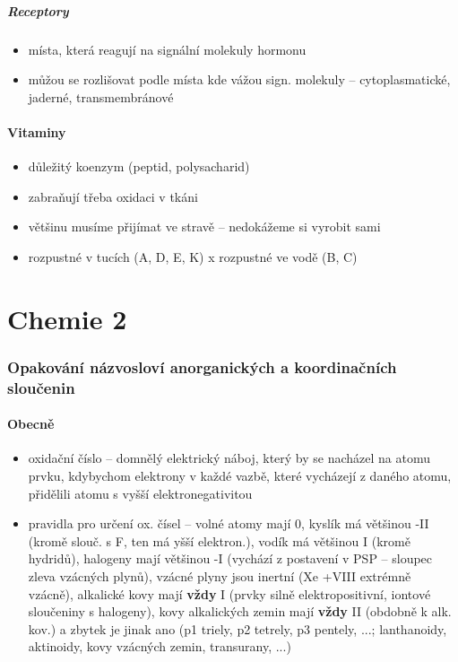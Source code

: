 \documentclass{article}
\begin{document}
\subsubsection{Receptory}
\begin{itemize}
  \item místa, která reagují na signální molekuly hormonu
  \item můžou se rozlišovat podle místa kde vážou sign. molekuly -- cytoplasmatické, jaderné, transmembránové
\end{itemize}

\subsection{Vitaminy}
\begin{itemize}
  \item důležitý koenzym (peptid, polysacharid)
  \item zabraňují třeba oxidaci v tkáni
  \item většinu musíme přijímat ve stravě -- nedokážeme si vyrobit sami
  \item rozpustné v tucích (A, D, E, K) x rozpustné ve vodě (B, C)
\end{itemize}

\part{Chemie 2}

\section{Opakování názvosloví anorganických a koordinačních sloučenin}

\subsection{Obecně}

\begin{itemize}
  \item oxidační číslo -- domnělý elektrický náboj, který by se nacházel na atomu prvku, kdybychom elektrony v každé vazbě, které vycházejí z daného atomu, přidělili atomu s vyšší elektronegativitou
  \item pravidla pro určení ox. čísel -- volné atomy mají 0, kyslík má většinou -II (kromě slouč. s F, ten má yšší elektron.), vodík má většinou I (kromě hydridů), halogeny mají většinou -I (vychází z postavení v PSP -- sloupec zleva vzácných plynů), vzácné plyny jsou inertní (Xe +VIII extrémně vzácně), alkalické kovy mají \textbf{vždy} I (prvky silně elektropositivní, iontové sloučeniny s halogeny), kovy alkalických zemin mají \textbf{vždy} II (obdobně k alk. kov.) a zbytek je jinak ano (p1 triely, p2 tetrely, p3 pentely, ...; lanthanoidy, aktinoidy, kovy vzácných zemin, transurany, ...)
\end{itemize}
\end{document}
